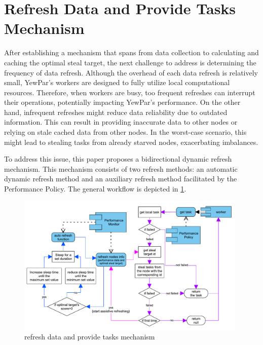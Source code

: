 \documentclass{mproj}
\begin{document}
\section{Refresh Data and Provide Tasks Mechanism}

After establishing a mechanism that spans from data collection to calculating and caching the optimal steal target,
the next challenge to address is determining the frequency of data refresh.
Although the overhead of each data refresh is relatively small,
YewPar's workers are designed to fully utilize local computational resources.
Therefore, when workers are busy, too frequent refreshes can interrupt their operations,
potentially impacting YewPar's performance.
On the other hand, infrequent refreshes might reduce data reliability due to outdated information.
This can result in providing inaccurate data to other nodes or relying on stale cached data from other nodes.
In the worst-case scenario, this might lead to stealing tasks from already starved nodes, exacerbating imbalances.

To address this issue, this paper proposes a bidirectional dynamic refresh mechanism.
This mechanism consists of two refresh methods: an automatic dynamic refresh method and an auxiliary refresh method facilitated by the Performance Policy.
The general workflow is depicted in \ref{fig:refresh_provide}.

\begin{figure}[h]
    \centering
    \includegraphics[width=0.98\textwidth]{images/refresh.pdf}
    \caption{refresh data and provide tasks mechanism}
    \label{fig:refresh_provide}
\end{figure}
\FloatBarrier
\end{document}
